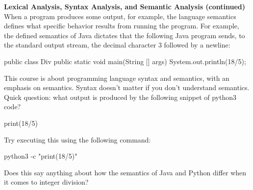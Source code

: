 \begin{minipage}[t]{\sw}
\slidenumber
\LARGE
{\bf Lexical Analysis, Syntax Analysis, and Semantic Analysis (continued)}\exx
When a program produces some output, for example,
the language semantics defines what specific behavior results
from running the program.
For example, the defined semantics of Java dictates
that the following Java program sends,
to the standard output stream, the decimal character 3
followed by a newline:
{\Large
\begin{qv}
public class Div {
    public static void main(String [] args) {
        System.out.println(18/5);
    }
}
\end{qv}
}
This course is about programming language syntax and semantics,
with an emphasis on semantics.
Syntax doesn't matter if you don't understand semantics.\exx
Quick question: what output is produced
by the following snippet of python3 code?
{\Large
\begin{qv}
print(18/5)
\end{qv}
}
Try executing this using the following command:
{\Large
\begin{qv}
python3 -c "print(18/5)"
\end{qv}
}
Does this say anything about how the semantics of Java and Python differ
when it comes to integer division? 
\end{minipage}
\clearpage
